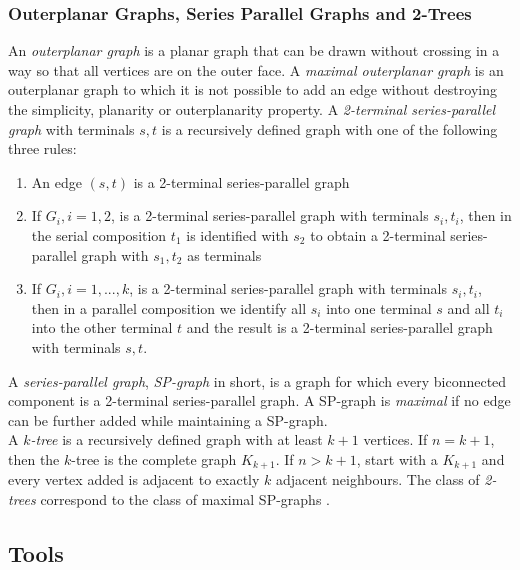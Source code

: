 \subsubsection{Outerplanar Graphs, Series Parallel Graphs and 2-Trees}
An \emph{outerplanar graph} is a planar graph that can be drawn without crossing in a way so that all vertices are on the outer face. A \emph{maximal outerplanar graph} is an outerplanar graph to which it is not possible to add an edge without destroying the simplicity, planarity or outerplanarity property. 
A \emph{2-terminal series-parallel graph} with terminals $s,t$ is a recursively defined graph with one of the following three rules:
\begin{enumerate}
	\item An edge $(s,t)$ is a 2-terminal series-parallel graph
	\item If $G_i, i = 1,2$, is a 2-terminal series-parallel graph with terminals $s_i,t_i$, then in the serial composition $t_1$ is identified with $s_2$ to obtain a 2-terminal series-parallel graph with $s_1,t_2$ as terminals
	\item If $G_i, i=1,...,k$, is a 2-terminal series-parallel graph with terminals $s_i,t_i$, then in a parallel composition we identify all $s_i$ into one terminal $s$ and all $t_i$ into the other terminal $t$ and the result is a 2-terminal series-parallel graph with terminals $s,t$.
\end{enumerate}
A \emph{series-parallel graph}, \emph{SP-graph} in short, is a graph for which every biconnected component is a 2-terminal series-parallel graph. A SP-graph is \emph{maximal} if no edge can be further added while maintaining a SP-graph. \cite[P. 143ff]{Biedl_SP}\\
A \emph{$k$-tree} is a recursively defined graph with at least $k+1$ vertices. If $n = k+1$, then the $k$-tree is the complete graph $K_{k+1}$. If $n>{k+1}$, start with a $K_{k+1}$ and every vertex added is adjacent to exactly $k$ adjacent neighbours. The class of \emph{2-trees} correspond to the class of maximal SP-graphs \cite[Page 2]{straight-line_2-trees}.
\subsection{Tools}
